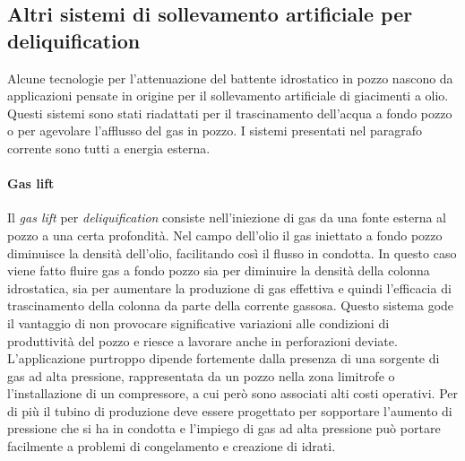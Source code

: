 \subsection[Altri sistemi per GWD]{Altri sistemi di sollevamento artificiale per deliquification}
Alcune tecnologie per l'attenuazione del battente idrostatico in pozzo nascono da applicazioni pensate in origine per il sollevamento artificiale di giacimenti a olio. Questi sistemi sono stati riadattati per il trascinamento dell'acqua a fondo pozzo o per agevolare l'afflusso del gas in pozzo. I sistemi presentati nel paragrafo corrente sono tutti a energia esterna.
\paragraph{Gas lift}
Il \textit{gas lift} per \textit{deliquification} consiste nell'iniezione di gas da una fonte esterna al pozzo a una certa profondità. Nel campo dell'olio il gas iniettato a fondo pozzo diminuisce la densità dell'olio, facilitando così il flusso in condotta. In questo caso viene fatto fluire gas a fondo pozzo sia per diminuire la densità della colonna idrostatica, sia per aumentare la produzione di gas effettiva e quindi l'efficacia di trascinamento della colonna da parte della corrente gassosa. Questo sistema gode il vantaggio di non provocare significative variazioni alle condizioni di produttività  del pozzo e riesce a lavorare anche in perforazioni deviate. L'applicazione purtroppo dipende fortemente dalla presenza di una sorgente di gas ad alta pressione, rappresentata da un pozzo nella zona limitrofe o l'installazione di un compressore, a cui però sono associati alti costi operativi. Per di più il tubino di produzione deve essere progettato per sopportare l'aumento di pressione che si ha in condotta e l'impiego di gas ad alta pressione può portare facilmente a problemi di congelamento e creazione di idrati.

